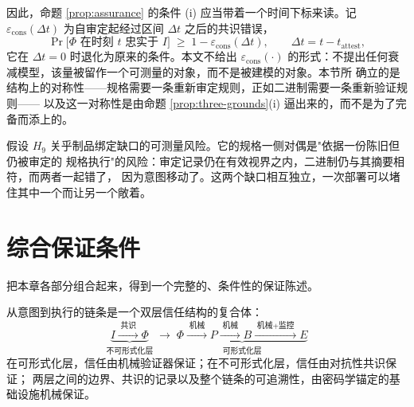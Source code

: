 因此，命题 \ref{prop:assurance} 的条件 (i) 应当带着一个时间下标来读。记
$\varepsilon_{\text{cons}}(\Delta t)$ 为自审定起经过区间 $\Delta t$ 之后的共识错误，
\begin{equation}\label{eq:spec-decay}
\Pr\bigl[\Phi \text{ 在时刻 } t \text{ 忠实于 } I\bigr] \;\ge\;
1 - \varepsilon_{\text{cons}}(\Delta t),
\qquad \Delta t = t - t_{\text{attest}},
\end{equation}
它在 $\Delta t = 0$ 时退化为原来的条件。本文不给出 $\varepsilon_{\text{cons}}(\cdot)$
的形式：不提出任何衰减模型，该量被留作一个可测量的对象，而不是被建模的对象。本节所
确立的是结构上的对称性——规格需要一条重新审定规则，正如二进制需要一条重新验证规则——
以及这一对称性是由命题 \ref{prop:three-grounds}(i) 逼出来的，而不是为了完备而添上的。

\begin{remark}[制品绑定缺口的规格一侧对偶]\label{rmk:spec-h9}
假设 $H_9$ 关乎制品绑定缺口的可测量风险。它的规格一侧对偶是"依据一份陈旧但仍被审定的
规格执行"的风险：审定记录仍在有效视界之内，二进制仍与其摘要相符，而两者一起错了，
因为意图移动了。这两个缺口相互独立，一次部署可以堵住其中一个而让另一个敞着。
\end{remark}

\section{综合保证条件}\label{sec:assurance-final}

把本章各部分组合起来，得到一个完整的、条件性的保证陈述。

\begin{definition}[双层信任结构]\label{def:two-layer}
从意图到执行的链条是一个双层信任结构的复合体：
\begin{equation}\label{eq:twolayer}
\underbrace{I \xrightarrow{\;\text{共识}\;} \Phi}_{\text{不可形式化层}}
\;\longrightarrow\;
\underbrace{\Phi \xrightarrow{\;\text{机械}\;} P \xrightarrow{\;\text{机械}\;} B
\xrightarrow{\;\text{机械}+\text{监控}\;} E}_{\text{可形式化层}}
\end{equation}
在可形式化层，信任由机械验证器保证；在不可形式化层，信任由对抗性共识保证；
两层之间的边界、共识的记录以及整个链条的可追溯性，由密码学锚定的基础设施机械保证。
\end{definition}


